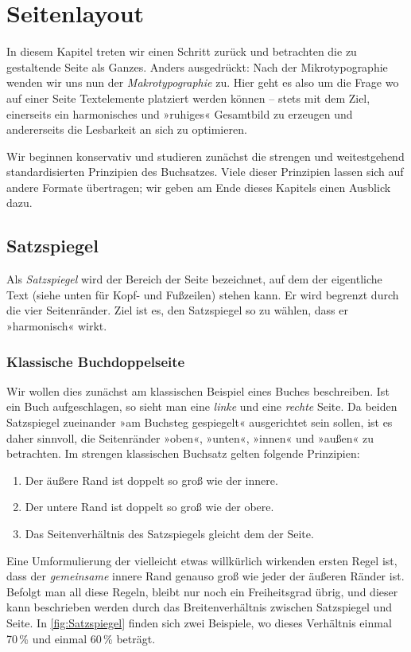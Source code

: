 \chapter{Seitenlayout}

In diesem Kapitel treten wir einen Schritt zurück und betrachten die zu
gestaltende Seite als Ganzes. Anders ausgedrückt: Nach der
Mikrotypographie wenden wir uns nun der \emph{Makrotypographie} zu. Hier geht es also um
die Frage wo auf einer Seite Textelemente platziert werden können – stets mit
dem Ziel, einerseits ein harmonisches und »ruhiges« Gesamtbild zu erzeugen und
andererseits die Lesbarkeit an sich zu optimieren.

Wir beginnen konservativ und studieren zunächst die strengen und weitestgehend
standardisierten Prinzipien des Buchsatzes. Viele dieser Prinzipien lassen sich
auf andere Formate übertragen; wir geben am Ende dieses Kapitels einen Ausblick
dazu.

\section{Satzspiegel}

Als \emph{Satzspiegel} wird der Bereich der Seite bezeichnet, auf dem der
eigentliche Text (siehe unten für Kopf- und Fußzeilen) stehen kann. Er wird
begrenzt durch die vier Seitenränder. Ziel ist es, den Satzspiegel so zu wählen,
dass er »harmonisch« wirkt.

\subsection{Klassische Buchdoppelseite}

Wir wollen dies zunächst am klassischen Beispiel eines Buches beschreiben. Ist
ein Buch aufgeschlagen, so sieht man eine \emph{linke} und eine \emph{rechte}
Seite. Da beiden Satzspiegel zueinander »am Buchsteg gespiegelt« ausgerichtet
sein sollen, ist es daher sinnvoll, die Seitenränder »oben«, »unten«, »innen«
und »außen« zu betrachten. Im strengen klassischen Buchsatz gelten folgende
Prinzipien:
\begin{enumerate}[nosep]
\item Der äußere Rand ist doppelt so groß wie der innere.
\item Der untere Rand ist doppelt so groß wie der obere.
\item Das Seitenverhältnis des Satzspiegels gleicht dem der Seite.
\end{enumerate}
Eine Umformulierung der vielleicht etwas willkürlich wirkenden ersten Regel ist,
dass der \emph{gemeinsame} innere Rand genauso groß wie jeder der äußeren Ränder
ist. Befolgt man all diese Regeln, bleibt nur noch ein Freiheitsgrad übrig, und
dieser kann beschrieben werden durch das Breitenverhältnis zwischen Satzspiegel
und Seite. In \cref{fig:Satzspiegel} finden sich zwei Beispiele, wo dieses
Verhältnis einmal 70\,\% und einmal 60\,\% beträgt.

